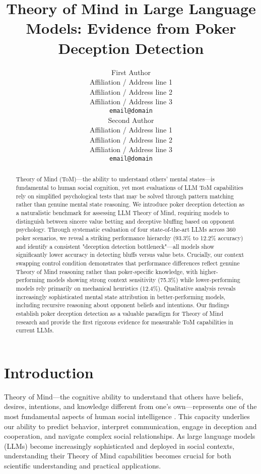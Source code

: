 \documentclass[11pt,a4paper]{article}
\title{Theory of Mind in Large Language Models: Evidence from Poker Deception Detection}
\author{First Author \\
  Affiliation / Address line 1 \\
  Affiliation / Address line 2 \\
  Affiliation / Address line 3 \\
  \texttt{email@domain} \\\And
  Second Author \\
  Affiliation / Address line 1 \\
  Affiliation / Address line 2 \\
  Affiliation / Address line 3 \\
  \texttt{email@domain} \\}
\date{}
\begin{document}
\maketitle

\begin{abstract}
Theory of Mind (ToM)—the ability to understand others' mental states—is fundamental to human social cognition, yet most evaluations of LLM ToM capabilities rely on simplified psychological tests that may be solved through pattern matching rather than genuine mental state reasoning. We introduce poker deception detection as a naturalistic benchmark for assessing LLM Theory of Mind, requiring models to distinguish between sincere value betting and deceptive bluffing based on opponent psychology. Through systematic evaluation of four state-of-the-art LLMs across 360 poker scenarios, we reveal a striking performance hierarchy (93.3\% to 12.2\% accuracy) and identify a consistent "deception detection bottleneck"—all models show significantly lower accuracy in detecting bluffs versus value bets. Crucially, our context swapping control condition demonstrates that performance differences reflect genuine Theory of Mind reasoning rather than poker-specific knowledge, with higher-performing models showing strong context sensitivity (75.3\%) while lower-performing models rely primarily on mechanical heuristics (12.4\%). Qualitative analysis reveals increasingly sophisticated mental state attribution in better-performing models, including recursive reasoning about opponent beliefs and intentions. Our findings establish poker deception detection as a valuable paradigm for Theory of Mind research and provide the first rigorous evidence for measurable ToM capabilities in current LLMs.
\end{abstract}

\section{Introduction}
\label{sec:introduction}

Theory of Mind—the cognitive ability to understand that others have beliefs, desires, intentions, and knowledge different from one's own—represents one of the most fundamental aspects of human social intelligence \cite{premack1978does}. This capacity underlies our ability to predict behavior, interpret communication, engage in deception and cooperation, and navigate complex social relationships. As large language models (LLMs) become increasingly sophisticated and deployed in social contexts, understanding their Theory of Mind capabilities becomes crucial for both scientific understanding and practical applications.
\end{document}
